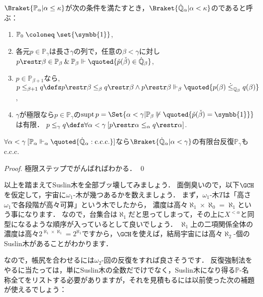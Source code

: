 \documentclass[a4j]{ltjsarticle}
\newcommand{\mathds}[1]{\symbb{#1}}
\renewcommand{\defeq}{\mathrel{\coloneq}}
\renewcommand{\emph}[1]{\textsf{\textgt{#1}}}
\begin{document}
\begin{definition}
 $\Braket{\mathbb{P}_\alpha | \alpha \leq \kappa}$が次の条件を満たすとき，$\Braket{\dot{\mathbb{Q}}_\alpha | \alpha < \kappa}$の\emph{有限台反復強制法}であると呼ぶ：
 \begin{enumerate}
  \item $\mathbb{P}_0 \defeq \set{\mathds{1}}$,
  \item 各元$p \in \mathbb{P}_\gamma$は長さ$\gamma$の列で，任意の$\beta < \gamma$に対し$p \restr \beta \in \mathbb{P}_\beta \mathbin{\&} \mathbb{P}_\beta \Vdash \quoted{\check{p}(\check{\beta}) \in \dot{\mathbb{Q}}_\beta}$,
  \item $p \in \mathbb{P}_{\beta + 1}$なら,
        $p \leq_{\beta+1} q \defs p \restr \beta \leq_\beta q \restr \beta \wedge p \restr \beta \Vdash_\beta \quoted{p(\beta) \mathrel{\dot{\leq}_{\mathbb{Q}_\beta}} q(\beta)}$,
  \item $\gamma$が極限なら$p \in \mathbb{P}_\gamma$の\emph{台}$\mathop{\mathrm{supt}}{p} = \Set{\alpha < \gamma | \mathbb{P}_\beta \not\Vdash \quoted{\check{p}(\check{\beta}) = \mathds{1}}}$は有限．
        $p \leq_\gamma q \defs \forall \alpha < \gamma \: [p\restr \alpha \leq_\alpha q \restr \alpha]$.
 \end{enumerate}
\end{definition}

\begin{fact}
 $\forall \alpha < \gamma \: [\mathbb{P}_\alpha \Vdash_\alpha \quoted{\dot{\mathbb{Q}}_\alpha: \text{c.c.c.}}]$なら$\Braket{\dot{\mathbb{Q}}_\alpha | \alpha < \gamma}$の有限台反復$\mathbb{P}_\gamma$もc.c.c.
\end{fact}
\begin{proof}
 極限ステップでがんばればわかる． \qed
\end{proof}

以上を踏まえてSuslin木を全部ブッ壊してみましょう．
面倒臭いので，以下$\GCH$を仮定して，宇宙に$\omega_1$-木が幾つあるかを数えましょう．
まず，$\omega_1$-木$T$は「高さ$\omega_1$で各段階が高々可算」という木でしたから，
濃度は高々$\aleph_1 \times \aleph_0 = \aleph_1$という事になります．
なので，台集合は$\aleph_1$だと思ってしまって，その上に$X^{<\alpha}$と同型になるような順序が入っているとして良いでしょう．
$\aleph_1$上の二項関係全体の濃度は高々$2^{\aleph_1 \times \aleph_1} = 2^{\aleph_1}$ですから，$\GCH$を使えば，結局宇宙には高々$\aleph_2$-個のSuslin木があることがわかります．

なので，帳尻を合わせるには$\omega_2$-回の反復をすれば良さそうです．
反復強制法をやるに当たっては，単にSuslin木の全数だでけでなく，Suslin木になり得る$\mathbb{P}$-名称全てをリストする必要がありますが，それを見積もるには以前使った次の補題が使えるでしょう：
\end{document}
